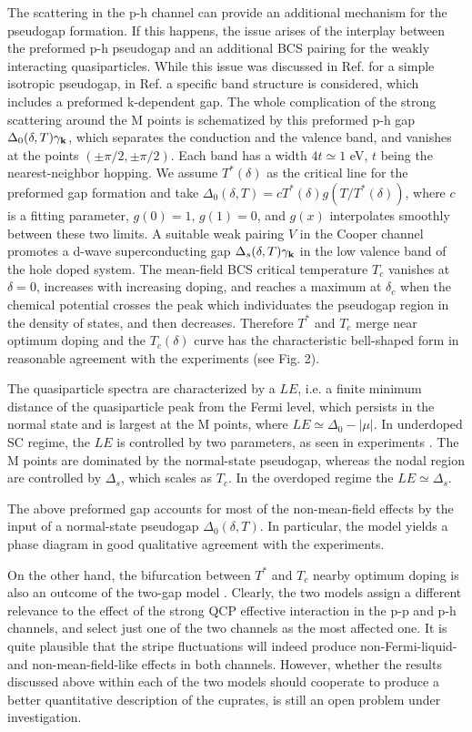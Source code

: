 \documentclass[twoside]{article}
\begin{document}
The scattering in the p-h channel can provide an additional mechanism for the 
pseudogap formation. If this happens, the issue arises of the interplay 
between the preformed p-h pseudogap and an additional BCS pairing for the 
weakly interacting quasiparticles. While this issue was discussed in Ref.
\cite{nozieres} for a simple isotropic pseudogap, in Ref. \cite{benfatto} a 
specific band structure is considered, which includes a preformed k-dependent 
gap. The whole complication of the strong scattering around the M points is 
schematized by this preformed p-h gap $\Delta_0(\delta,T) \gamma_{\bf k}$, 
which separates the conduction and the valence band, and vanishes at the 
points $(\pm \pi/2,\pm \pi/2)$. Each band has a width $4t\simeq 1$ eV, $t$ 
being the nearest-neighbor hopping. We assume $T^*(\delta)$ as the critical
line for the preformed gap formation and take $\Delta_0(\delta,T)=c 
T^*(\delta) g(T/T^*(\delta))$, where $c$ is a fitting parameter, $g(0)=1$,
$g(1)=0$, and $g(x)$ interpolates smoothly between these two limits. A 
suitable weak pairing $V$ in the Cooper channel promotes a d-wave 
superconducting gap $\Delta_s(\delta,T) \gamma_{\bf k}$ in the low valence 
band of the hole doped system. The mean-field BCS critical temperature $T_c$ 
vanishes at $\delta=0$, increases with increasing doping, and reaches a maximum
at $\delta_c$ when the chemical potential crosses the peak which individuates 
the pseudogap region in the density of states, and then decreases. Therefore 
$T^*$ and $T_c$ merge near optimum doping and the $T_c(\delta)$ curve has the 
characteristic bell-shaped form in reasonable agreement with the experiments 
(see Fig. 2).

The quasiparticle spectra are characterized by a $LE$, i.e. a finite minimum
distance of the quasiparticle peak from the Fermi level, which persists in 
the normal state and is largest at the M points, where $LE\simeq \Delta_0-
|\mu|$. In underdoped SC regime, the $LE$ is controlled by two parameters, as 
seen in experiments \cite{PX,TWO}. The M points are dominated by the 
normal-state pseudogap, whereas the nodal region are controlled by 
$\Delta_s$, which scales as $T_c$. In the overdoped regime the $LE\simeq
\Delta_s$.

The above preformed gap accounts for most of the non-mean-field effects by 
the input of a normal-state pseudogap $\Delta_0(\delta,T)$. In particular, 
the model yields a phase diagram in good qualitative agreement with the 
experiments. 

On the other hand, the bifurcation between $T^*$ and $T_c$ nearby optimum 
doping is also an outcome of the two-gap model \cite{twogap}. Clearly, the 
two models assign a different relevance to the effect of the strong QCP 
effective interaction in the p-p and p-h channels, and select just one of the 
two channels as the most affected one. It is quite plausible that the stripe 
fluctuations will indeed produce non-Fermi-liquid- and non-mean-field-like 
effects in both channels. However, whether the results discussed above within 
each of the two models should cooperate to produce a better quantitative 
description of the cuprates, is still an open problem under investigation.
\end{document}
